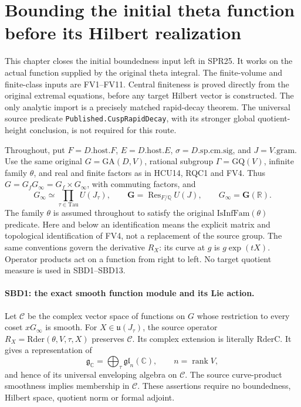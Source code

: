 \section{Bounding the initial theta function before its Hilbert realization}
\label{sec:seed-boundedness}

This chapter closes the initial boundedness input left in SPR25.  It
works on the actual function supplied by the original theta integral.
The finite-volume and finite-class inputs are FV1--FV11.  Central
finiteness is proved directly from the original extremal equations,
before any target Hilbert vector is constructed.  The only analytic
import is a precisely matched rapid-decay theorem.  The universal
source predicate \texttt{Published.\allowbreak Cusp\allowbreak Rapid\allowbreak Decay}, with its stronger
global quotient-height conclusion, is not required for this route.

Throughout, put \(F=D.\mathrm{host}.F\),
\(E=D.\mathrm{host}.E\), \(\sigma=D.\mathrm{sp.cm.sig}\),
and \(J=V.\mathrm{gram}\).  Use the same original
\(G=\mathrm{GA}(D,V)\), rational subgroup \(\Gamma=\mathrm{GQ}(V)\),
infinite family \(\theta\), and real and finite factors as in HCU14,
RQC1 and FV4.  Thus \(G=G_fG_\infty=G_f\times G_\infty\), with
commuting factors, and
\[
 G_\infty\simeq\prod_{\tau\in\mathrm{Tau}}U(J_\tau),\qquad
 \mathbf G=\operatorname{Res}_{F/\mathbb Q}U(J),\qquad
 G_\infty=\mathbf G(\mathbb R).
 \tag{SBD.1}
\]
The family \(\theta\) is assumed throughout to satisfy the original
\(\mathrm{IsInfFam}(\theta)\) predicate.
Here and below an identification means the explicit matrix and
topological identification of FV4, not a replacement of the source
group.  The same conventions govern the derivative \(R_X\): its
curve at \(g\) is \(g\exp(tX)\).  Operator products act on a function
from right to left.  No target quotient measure is used in SBD1--SBD13.

\paragraph{SBD1: the exact smooth function module and its Lie action.}
\label{claim:SBD1}
Let \(\mathcal C\) be the complex vector space of functions on \(G\)
whose restriction to every coset \(xG_\infty\) is smooth.  For
\(X\in\mathfrak u(J_\tau)\), the source operator
\(R_X=\mathrm{Rder}(\theta,V,\tau,X)\) preserves \(\mathcal C\).
Its complex extension is literally \(\mathrm{RderC}\).  It gives a
representation of
\[
 \mathfrak g_{\mathbb C}
   =\bigoplus_\tau\mathfrak{gl}_{n}(\mathbb C),
 \qquad n=\operatorname{rank}V,
\]
and hence of its universal enveloping algebra on \(\mathcal C\).
The source curve-product smoothness implies membership in
\(\mathcal C\).  These assertions require no boundedness, Hilbert
space, quotient norm or formal adjoint.

